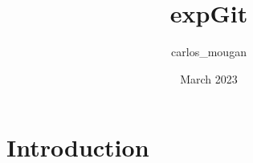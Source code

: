 \documentclass{article}
\title{expGit}
\author{carlos_mougan }
\date{March 2023}
\begin{document}
\maketitle

\section{Introduction}
\end{document}

